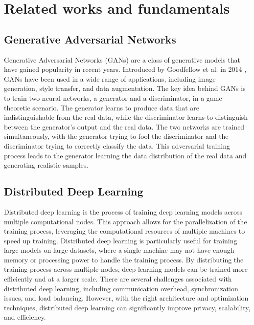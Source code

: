 \chapter{Related works and fundamentals}

\section{Generative Adversarial Networks}
Generative Adversarial Networks (GANs) are a class of generative models that have gained popularity in recent years. Introduced by Goodfellow et al. in 2014 \cite{goodfellow2014generative}, GANs have been used in a wide range of applications, including image generation, style transfer, and data augmentation. The key idea behind GANs is to train two neural networks, a generator and a discriminator, in a game-theoretic scenario. The generator learns to produce data that are indistinguishable from the real data, while the discriminator learns to distinguish between the generator's output and the real data. The two networks are trained simultaneously, with the generator trying to fool the discriminator and the discriminator trying to correctly classify the data. This adversarial training process leads to the generator learning the data distribution of the real data and generating realistic samples.

\section{Distributed Deep Learning}
Distributed deep learning is the process of training deep learning models across multiple computational nodes. This approach allows for the parallelization of the training process, leveraging the computational resources of multiple machines to speed up training. Distributed deep learning is particularly useful for training large models on large datasets, where a single machine may not have enough memory or processing power to handle the training process. By distributing the training process across multiple nodes, deep learning models can be trained more efficiently and at a larger scale. There are several challenges associated with distributed deep learning, including communication overhead, synchronization issues, and load balancing. However, with the right architecture and optimization techniques, distributed deep learning can significantly improve privacy, scalability, and efficiency.

